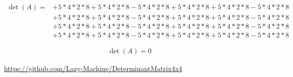 \documentclass{article}
\begin{document}
\begin{align*}
  \det(A)=&+5*4*2*8+5*4*2*8-5*4*2*8+5*4*2*8+5*4*2*8-5*4*2*8\\
          &+5*4*2*8+5*4*2*8-5*4*2*8+5*4*2*8+5*4*2*8-5*4*2*8\\
          &+5*4*2*8+5*4*2*8-5*4*2*8+5*4*2*8+5*4*2*8-5*4*2*8\\
          &+5*4*2*8+5*4*2*8-5*4*2*8+5*4*2*8+5*4*2*8-5*4*2*8
\end{align*}

\begin{align*}
  \det(A)=0
\end{align*}\vspace{\fill}

\begin{center}
  \href{https://github.com/Lazy-Machine/DeterminantMatrix4x4}{https://github.com/Lazy-Machine/DeterminantMatrix4x4}
\end{center}
\end{document}
